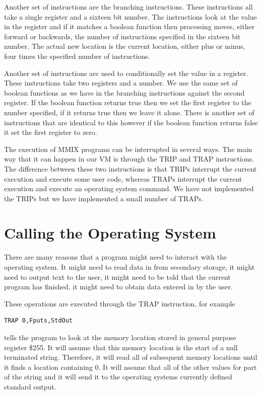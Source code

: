 \documentclass[a4paper,11pt]{report}
\begin{document}
Another set of instructions are the branching instructions. These instructions all take a single register and a sixteen bit number. The instructions look at the value in the register and if it matches a boolean function then processing moves, either forward or backwards, the number of instructions specified in the sixteen bit number. The actual new location is the current location, either plus or minus, four times the specified number of instructions.

Another set of instructions are used to conditionally set the value in a register. These instructions take two registers and a number. We use the same set of boolean functions as we have in the branching instructions against the second register. If the boolean function returns true then we set the first register to the number specified, if it returns true then we leave it alone. There is another set of instructions that are identical to this however if the boolean function returns false it set the first register to zero.

The execution of MMIX programs can be interrupted in several ways. The main way that it can happen in our VM is through the TRIP and TRAP instructions. The difference between these two instructions is that TRIPs interrupt the current execution and execute some user code, whereas TRAPs interrupt the current execution and execute an operating system command. We have not implemented the TRIPs but we have implemented a small number of TRAPs.
\section{Calling the Operating System}\label{trip:trap}
There are many reasons that a program might need to interact with the operating system. It might need to read data in from secondary storage, it might need to output text to the user, it might need to be told that the current program has finished, it might need to obtain data entered in by the user.

These operations are executed through the TRAP instruction, for example

\begin{lstlisting}
TRAP 0,Fputs,StdOut
\end{lstlisting}
tells the program to look at the memory location stored in general purpose register \$255. It will assume that this memory location is the start of a null terminated string. Therefore, it will read all of subsequent memory locations until it finds a location containing 0. It will assume that all of the other values for part of the string and it will send it to the operating systems currently defined standard output.
\end{document}
